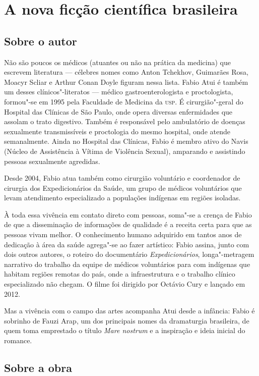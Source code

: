 \chapter{A nova ficção científica brasileira}

\section{Sobre o autor}


\noindent{}Não são poucos os médicos (atuantes ou não na prática da medicina) que escrevem literatura --- célebres nomes como Anton Tchekhov, Guimarães Rosa, Moacyr Scliar e Arthur Conan Doyle figuram nessa lista. Fabio Atui é também um desses clínicos"-literatos --- médico gastroenterologista e proctologista, formou"-se em 1995 pela Faculdade de Medicina da \textsc{usp}. É cirurgião"-geral do Hospital das Clínicas de São Paulo, onde opera diversas enfermidades que assolam o trato digestivo. Também é responsável pelo ambulatório de doenças sexualmente transmissíveis e proctologia do mesmo hospital, onde atende semanalmente. Ainda no Hospital das Clínicas, Fabio é membro ativo do Navis (Núcleo de Assistência à Vítima de Violência Sexual), amparando e assistindo pessoas sexualmente agredidas.

Desde 2004, Fabio atua também como cirurgião voluntário e coordenador de cirurgia dos Expedicionários da Saúde, um grupo de médicos voluntários que levam atendimento especializado a populações indígenas em regiões isoladas. 

À toda essa vivência em contato direto com pessoas, soma"-se a crença de Fabio de que a disseminação de informações de qualidade é a receita certa para que as pessoas vivam melhor. O conhecimento humano adquirido em tantos anos de dedicação à área da saúde agrega"-se ao fazer artístico: Fabio assina, junto com dois outros autores, o roteiro do documentário \emph{Expedicionários}, longa"-metragem narrativo do trabalho da equipe de médicos voluntários para com indígenas que habitam regiões remotas do país, onde a infraestrutura e o trabalho clínico especializado não chegam. O filme foi dirigido por Octávio Cury e lançado em 2012. 

Mas a vivência com o campo das artes acompanha Atui desde a infância: Fabio é sobrinho de Fauzi Arap, um dos principais nomes da dramaturgia brasileira, de quem toma emprestado o título \emph{Mare nostrum} e a inspiração e ideia inicial do romance.

\section{Sobre a obra}

